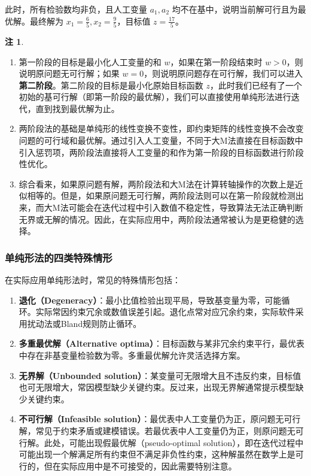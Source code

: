 \documentclass[12pt]{article}
\theoremstyle{plain}
\theoremstyle{definition}
\newtheorem{rmk}{注}[subsection]
\begin{document}
此时，所有检验数均非负，且人工变量 $a_1, a_2$ 均不在基中，说明当前解可行且为最优解。最终解为 $x_1 = \frac{6}{5}, x_2 = \frac{9}{5}$，目标值 $z = \frac{17}{5}$。

\begin{rmk}
    \begin{enumerate}
        \item 第一阶段的目标是最小化人工变量的和 $w$，如果在第一阶段结束时 $w > 0$，则说明原问题无可行解；如果 $w = 0$，则说明原问题存在可行解，我们可以进入\textbf{第二阶段}。第二阶段的目标是最小化原始目标函数 $z$，此时我们已经有了一个初始的基可行解（即第一阶段的最优解），我们可以直接使用单纯形法进行迭代，直到找到最优解为止。
        \item 两阶段法的基础是单纯形的线性变换不变性，即约束矩阵的线性变换不会改变问题的可行域和最优解。通过引入人工变量，不同于大M法直接在目标函数中引入惩罚项，两阶段法直接将人工变量的和作为第一阶段的目标函数进行阶段性优化。
        \item 综合看来，如果原问题有解，两阶段法和大M法在计算转轴操作的次数上是近似相等的。但是，如果原问题无可行解，两阶段法则可以在第一阶段就检测出来，而大M法可能会在迭代过程中引入数值不稳定性，导致算法无法正确判断无界或无解的情况。因此，在实际应用中，两阶段法通常被认为是更稳健的选择。
    \end{enumerate}
\end{rmk}

\subsubsection{单纯形法的四类特殊情形}\label{subsubsec:special_cases}

在实际应用单纯形法时，常见的特殊情形包括：
\begin{enumerate}
    \item \textbf{退化（Degeneracy）}：最小比值检验出现平局，导致基变量为零，可能循环。实际常因约束冗余或数值误差引起。退化点常对应冗余约束，实际软件采用扰动法或Bland规则防止循环。

    \item \textbf{多重最优解（Alternative optima）}：目标函数与某非冗余约束平行，最优表中存在非基变量检验数为零。多重最优解允许灵活选择方案。

    \item \textbf{无界解（Unbounded solution）}：某变量可无限增大且不违反约束，目标值也可无限增大，常因模型缺少关键约束。反过来，出现无界解通常提示模型缺少关键约束。

    \item \textbf{不可行解（Infeasible solution）}：最优表中人工变量仍为正，原问题无可行解，常见于约束矛盾或建模错误。若最优表中人工变量仍为正，则原问题无可行解。此处，可能出现假最优解（pseudo-optimal solution），即在迭代过程中可能出现一个解满足所有约束但不满足非负性约束，这种解虽然在数学上是可行的，但在实际应用中是不可接受的，因此需要特别注意。
\end{enumerate}
\end{document}
